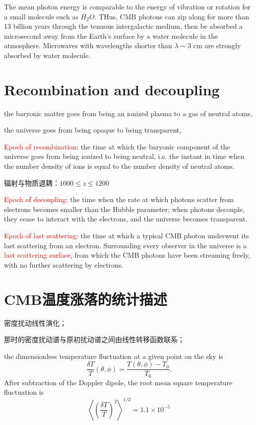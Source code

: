 \documentclass[12pt,a4paper]{article}
\begin{document}
The mean photon energy is comparable to the energy of vibration or rotation for a small molecule such as $H_2O$. THus, CMB photons can zip along for more than 13 billion years through the tenuous intergalactic medium, then be absorbed a microsecond away from the Earth's surface by a water molecule in the atmosphere. Microwaves with wavelengths shorter than $\lambda \sim 3$ cm are strongly absorbed by water molecule.

\section{Recombination and decoupling}
the baryonic matter goes from being an ionized plasma to a gas of neutral atoms,

the universe goes from being opaque to being transparent,

\textcolor{red}{Epoch of recombination}: the time at which the baryonic component of the universe goes from being ionized to being neutral, i.e. the instant in time when the number density of ions is equal to the number density of neutral atoms.

辐射与物质退耦：$1000 \leq z \leq 1200$

\textcolor{red}{Epoch of decoupling}: the time when the rate at which photons scatter from electrons  becomes smaller than the Hubble parameter; when photons decouple, they cease to interact with the electrons, and the universe becomes transparent.

\textcolor{red}{Epoch of last scattering}: the time at which a typical CMB photon underwent its last scattering from an electron. Surrounding every observer in the universe is a \textcolor{red}{last scattering surface}, from which the CMB photons have been streaming freely, with no further scattering by electrons.


\section{CMB温度涨落的统计描述}
\cite{2010宇宙大尺度结构的形成, 2012宇宙大尺度结构的形成} 密度扰动线性演化；

那时的密度扰动谱与原初扰动谱之间由线性转移函数联系；

the dimensionless temperature fluctuation at a given point on the sky is
\begin{equation}
\frac{\delta T}{T}(\theta, \phi) = \frac{T(\theta, \phi) -T_0}{T_0} .
\end{equation}
After subtraction of the Doppler dipole, the root mean square temperature fluctuation is
\begin{equation}
\left\langle \left(\frac{\delta T}{T}\right)^2 \right\rangle^{1/2} = 1.1 \times 10^{-5}
\end{equation}
\end{document}
